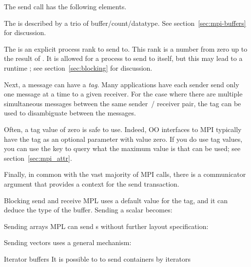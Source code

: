 The send call has the following elements.

The  is described by a trio of buffer/count/datatype.
See section~\ref{sec:mpi-buffers} for discussion.

The   is an
explicit process rank to send to.  This rank is a number from zero up
to the result of .
It is allowed for a process to send to itself, but
this may lead to a runtime ;
see section~\ref{sec:blocking} for discussion.

Next, a message can have a
\emph{tag}.
Many applications have each sender send only one message at a time
to a given receiver.
For the case where there are
multiple simultaneous messages between the same sender~/ receiver pair,
the tag can be used to disambiguate between
the messages.

Often, a tag value of zero is safe to use.
Indeed, \ac{OO} interfaces to MPI typically have  the tag
as an optional parameter with value zero.
If you do
use tag values, you can use the key  to query
what the maximum value is that can be used; see
section~\ref{sec:mpi_attr}.

Finally, in common with the vast majority of MPI calls,
there is a communicator argument that provides a context for the send transaction.

\begin{mplnote}{Blocking send and receive}
  \ac{MPL} uses a default value for the tag, and it can deduce the type
  of the buffer. Sending a scalar becomes:
\end{mplnote}

\begin{mplnote}{Sending arrays}
  \ac{MPL} can send s
  without further layout specification:

  Sending vectors uses a general mechanism:
  
\end{mplnote}

\begin{mplnote}{Iterator buffers}
  It is possible to to send containers by iterators
\end{mplnote}

